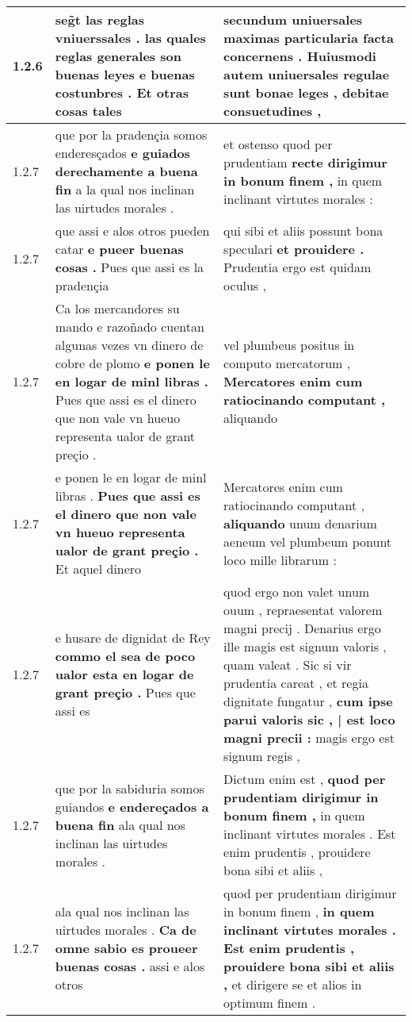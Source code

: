 \begin{tabular}{|p{1cm}|p{6.5cm}|p{6.5cm}|}
1.2.6 & seg̃t las reglas vniuerssales . \textbf{ las quales reglas generales son buenas leyes e buenas costunbres . } Et otras cosas tales & secundum uniuersales maximas particularia facta concernens . \textbf{ Huiusmodi autem uniuersales regulae sunt bonae leges , } debitae consuetudines , \\\hline
1.2.7 & que por la pradençia somos enderesçados \textbf{ e guiados derechamente a buena fin } a la qual nos inclinan las uirtudes morales . & et ostenso quod per prudentiam \textbf{ recte dirigimur in bonum finem , } in quem inclinant virtutes morales : \\\hline
1.2.7 & que assi e alos otros pueden catar \textbf{ e pueer buenas cosas . } Pues que assi es la pradençia & qui sibi et aliis possunt bona speculari \textbf{ et prouidere . } Prudentia ergo est quidam oculus , \\\hline
1.2.7 & Ca los mercandores su mando e razoñado cuentan algunas vezes vn dinero de cobre de plomo \textbf{ e ponen le en logar de minl libras . } Pues que assi es el dinero que non vale vn hueuo representa ualor de grant preçio . & vel plumbeus positus in computo mercatorum , \textbf{ Mercatores enim cum ratiocinando computant , } aliquando \\\hline
1.2.7 & e ponen le en logar de minl libras . \textbf{ Pues que assi es el dinero que non vale vn hueuo representa ualor de grant preçio . } Et aquel dinero & Mercatores enim cum ratiocinando computant , \textbf{ aliquando } unum denarium aeneum vel plumbeum ponunt loco mille librarum : \\\hline
1.2.7 & e husare de dignidat de Rey \textbf{ commo el sea de poco ualor esta en logar de grant preçio . } Pues que assi es & quod ergo non valet unum ouum , repraesentat valorem magni precij . Denarius ergo ille magis est signum valoris , quam valeat . Sic si vir prudentia careat , et regia dignitate fungatur , \textbf{ cum ipse parui valoris sic , | est loco magni precii : } magis ergo est signum regis , \\\hline
1.2.7 & que por la sabiduria somos guiandos \textbf{ e endereçados a buena fin } ala qual nos inclinan las uirtudes morales . & Dictum enim est , \textbf{ quod per prudentiam dirigimur in bonum finem , } in quem inclinant virtutes morales . Est enim prudentis , prouidere bona sibi et aliis , \\\hline
1.2.7 & ala qual nos inclinan las uirtudes morales . \textbf{ Ca de omne sabio es proueer buenas cosas . } assi e alos otros & quod per prudentiam dirigimur in bonum finem , \textbf{ in quem inclinant virtutes morales . Est enim prudentis , prouidere bona sibi et aliis , } et dirigere se et alios in optimum finem . \\\hline

\end{tabular}

